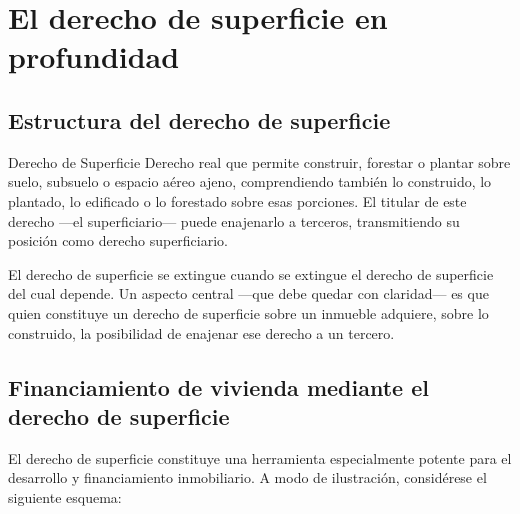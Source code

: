 \documentclass[12pt,oneside]{book}
\begin{document}

\chapter{El derecho de superficie en profundidad}

\section{Estructura del derecho de superficie}

\begin{definition}{Derecho de Superficie}
Derecho real que permite construir, forestar o plantar sobre suelo, subsuelo o espacio aéreo ajeno, comprendiendo también lo construido, lo plantado, lo edificado o lo forestado sobre esas porciones. El titular de este derecho ---el superficiario--- puede enajenarlo a terceros, transmitiendo su posición como derecho superficiario.
\end{definition}

El derecho de superficie se extingue cuando se extingue el derecho de superficie del cual depende. Un aspecto central ---que debe quedar con claridad--- es que quien constituye un derecho de superficie sobre un inmueble adquiere, sobre lo construido, la posibilidad de enajenar ese derecho a un tercero.

\section{Financiamiento de vivienda mediante el derecho de superficie}

El derecho de superficie constituye una herramienta especialmente potente para el desarrollo y financiamiento inmobiliario. A modo de ilustración, considérese el siguiente esquema:
\end{document}
